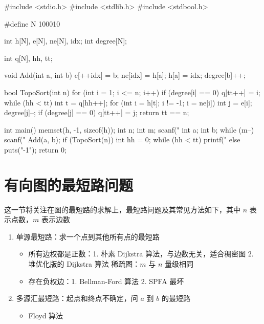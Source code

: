 \begin{mycpptwocol}[拓扑排序]
    #include <stdio.h>
    #include <stdlib.h>
    #include <stdbool.h>

    #define N 100010

    int h[N], e[N], ne[N], idx;
    int degree[N];

    int q[N], hh, tt;

    void Add(int a, int b) {
        e[++idx] = b;
        ne[idx] = h[a];
        h[a] = idx;
        degree[b]++;
    }

    bool TopoSort(int n) {
        for (int i = 1; i <= n; i++) {
            if (degree[i] == 0) {
                q[tt++] = i;
            }
        }
        while (hh < tt) {
            int t = q[hh++];
            for (int i = h[t]; i != -1; i = ne[i]) {
                int j = e[i];
                degree[j]--;
                if (degree[j] == 0) {
                    q[tt++] = j;
                }
            }
        }
        return tt == n;
    }

    int main() {
        memset(h, -1, sizeof(h));
        int n;
        int m;
        scanf("%
        int a;
        int b;
        while (m--) {
            scanf("%
            Add(a, b);
        }
        if (TopoSort(n)) {
            int hh = 0;
            while (hh < tt) {
                printf("%
            }
        } else {
            puts("-1");
        }
        return 0;
    }
\end{mycpptwocol}


\section{有向图的最短路问题}
这一节将关注在图的最短路的求解上，最短路问题及其常见方法如下，其中 $n$ 表示点数，$m$ 表示边数

\begin{enumerate}
    \item 单源最短路：求一个点到其他所有点的最短路
    \begin{itemize}
        \item 所有边权都是正数：1. 朴素 Dijkstra 算法，与边数无关，适合稠密图 2. 堆优化版的 Dijkstra 算法  稀疏图：$m$ 与 $n$ 量级相同
        \item 存在负权边：1. Bellman-Ford 算法  2. SPFA 最坏 
    \end{itemize}
    \item 多源汇最短路：起点和终点不确定，问 $a$ 到 $b$ 的最短路
    \begin{itemize}
        \item Floyd 算法 
    \end{itemize}
\end{enumerate}

